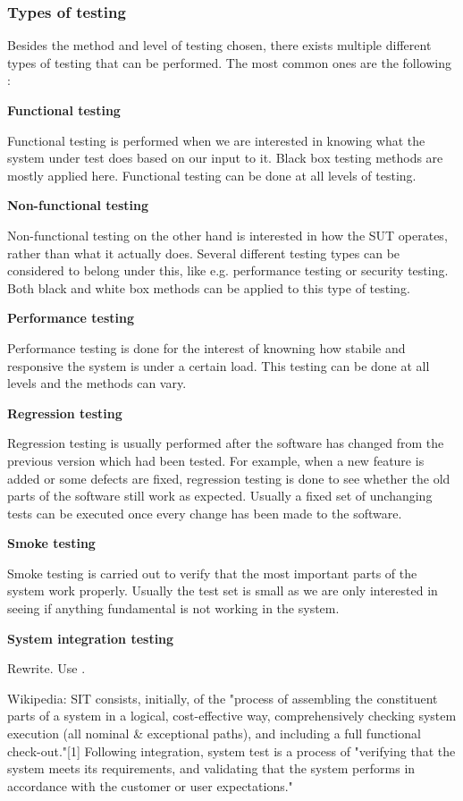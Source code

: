 \documentclass[english,12pt,a4paper,pdftex,elec,utf8]{aaltothesis}
\begin{document}
\subsubsection{Types of testing}
Besides the method and level of testing chosen, there exists multiple different types of testing that can be performed. The most common ones are the following \cite{sularikurssi}:\par
\textbf{Functional testing}\par
Functional testing is performed when we are interested in knowing what the system under test does based on our input to it. Black box testing methods are mostly applied here. Functional testing can be done at all levels of testing.\par 
\textbf{Non-functional testing}\par
Non-functional testing on the other hand is interested in how the SUT operates, rather than what it actually does. Several different testing types can be considered to belong under this, like e.g. performance testing or security testing. Both black and white box methods can be applied to this type of testing.\par 
\textbf{Performance testing}\par
Performance testing is done for the interest of knowning how stabile and responsive the system is under a certain load. This testing can be done at all levels and the methods can vary.\par 
\textbf{Regression testing}\par
Regression testing is usually performed after the software has changed from the previous version which had been tested. For example, when a new feature is added or some defects are fixed, regression testing is done to see whether the old parts of the software still work as expected. Usually a fixed set of unchanging tests can be executed once every change has been made to the software. \cite{sularikurssi}\par 
\textbf{Smoke testing}\par
Smoke testing is carried out to verify that the most important parts of the system work properly. Usually the test set is small as we are only interested in seeing if anything fundamental is not working in the system.\par 
\textbf{System integration testing}\par
Rewrite. Use \cite{systinttesting1}.\par
Wikipedia: SIT consists, initially, of the "process of assembling the constituent parts of a system in a logical, cost-effective way, comprehensively checking system execution (all nominal \& exceptional paths), and including a full functional check-out."[1] Following integration, system test is a process of "verifying that the system meets its requirements, and validating that the system performs in accordance with the customer or user expectations."\par
\end{document}
